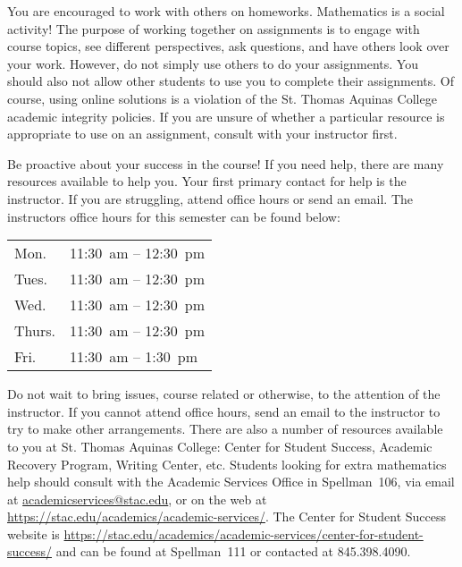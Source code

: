 \documentclass[11pt,letterpaper]{article}
\begin{document}
You are encouraged to work with others on homeworks. Mathematics is a social activity! The purpose of working together on assignments is to engage with course topics, see different perspectives, ask questions, and have others look over your work. However, do not simply use others to do your assignments. You should also not allow other students to use you to complete their assignments. Of course, using online solutions is a violation of the St. Thomas Aquinas College academic integrity policies. If you are unsure of whether a particular resource is appropriate to use on an assignment, consult with your instructor first. \sectionbreak



Be proactive about your success in the course! If you need help, there are many resources available to help you. Your first primary contact for help is the instructor. If you are struggling, attend office hours or send an email. The instructors office hours for this semester can be found below: \par
	\begin{table}[!ht]
	\centering
	\begin{tabular}{l || l}
	Mon. & 11:30~am -- 12:30~pm \\
	Tues. & 11:30~am -- 12:30~pm \\
	Wed. & 11:30~am -- 12:30~pm \\
	Thurs. & 11:30~am -- 12:30~pm \\
	Fri. & 11:30~am -- 1:30~pm
	\end{tabular}
	\end{table}
Do not wait to bring issues, course related or otherwise, to the attention of the instructor. If you cannot attend office hours, send an email to the instructor to try to make other arrangements. There are also a number of resources available to you at St. Thomas Aquinas College: Center for Student Success, Academic Recovery Program, Writing Center, etc. Students looking for extra mathematics help should consult with the Academic Services Office in Spellman~106, via email at \href{mailto:AcademicServices@stac.edu}{academicservices@stac.edu}, or on the web at \href{https://stac.edu/academics/academic-services/}{https://stac.edu/academics/academic-services/}. The Center for Student Success website is \url{https://stac.edu/academics/academic-services/center-for-student-success/} and can be found at Spellman~111 or contacted at 845.398.4090. \sectionbreak
\end{document}
